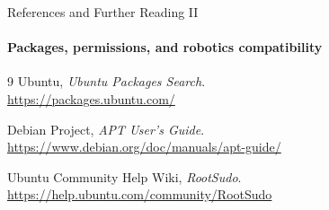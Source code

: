 \begin{frame}{References and Further Reading II}
\framesubtitle{Packages, permissions, and robotics compatibility}

\scriptsize
\begin{thebibliography}{9}
    Ubuntu, \emph{Ubuntu Packages Search}.\\
    \url{https://packages.ubuntu.com/}

    Debian Project, \emph{APT User's Guide}.\\
    \url{https://www.debian.org/doc/manuals/apt-guide/}

    Ubuntu Community Help Wiki, \emph{RootSudo}.\\
    \url{https://help.ubuntu.com/community/RootSudo}


\end{thebibliography}
\end{frame}